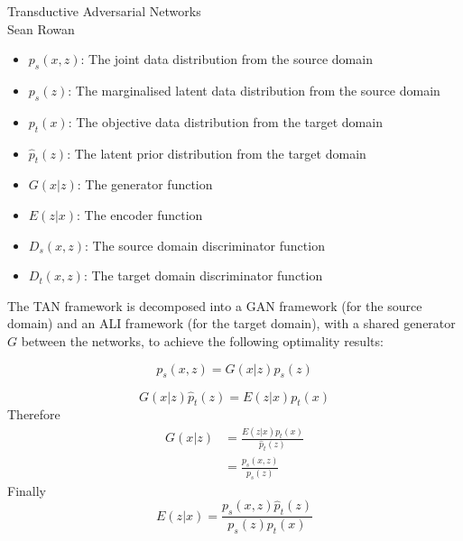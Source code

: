 \documentclass[a4paper,10pt]{article}
\begin{document}
\begin{bf}
\begin{center}
Transductive Adversarial Networks\\
Sean Rowan
\end{center}
\end{bf}

\begin{itemize}
\item $p_s(x,z)$: The joint data distribution from the source domain
\item $p_s(z)$: The marginalised latent data distribution from the source domain
\item $p_t(x)$: The objective data distribution from the target domain
\item $\hat{p}_t(z)$: The latent prior distribution from the target domain
\item $G(x|z)$: The generator function
\item $E(z|x)$: The encoder function
\item $D_s(x,z)$: The source domain discriminator function
\item $D_t(x,z)$: The target domain discriminator function
\end{itemize}

The TAN framework is decomposed into a GAN framework (for the source domain) and an ALI framework (for the target domain), with a shared generator $G$ between the networks, to achieve the following optimality results:

\begin{equation}
p_s(x,z) = G(x|z)p_s(z)
\end{equation}

\begin{equation}
G(x|z)\hat{p}_t(z) = E(z|x)p_t(x)
\end{equation}
Therefore
\begin{equation}
\begin{split}
G(x|z) &= \frac{E(z|x)p_t(x)}{\hat{p}_t(z)}\\
&= \frac{p_s(x,z)}{p_s(z)}
\end{split}
\end{equation}
Finally
\begin{equation}
E(z|x) = \frac{p_s(x,z)\hat{p}_t(z)}{p_s(z)p_t(x)}
\end{equation}
\end{document}
